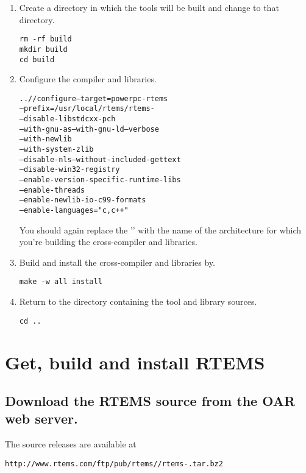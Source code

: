 \documentclass{report}
\begin{document}
\begin{enumerate}
\item Create a directory in which the tools will be built and
change to that directory.
\begin{verbatim}
rm -rf build
mkdir build
cd build
\end{verbatim}

\item Configure the compiler and libraries.
\begin{alltt}
../\GCC/configure --target=powerpc-rtems\rtemsVersion \verb@\@
            --prefix=/usr/local/rtems/rtems-\rtemsVersion \verb@\@
            --disable-libstdcxx-pch \verb@\@
            --with-gnu-as --with-gnu-ld --verbose \verb@\@
            --with-newlib \verb@\@
            --with-system-zlib \verb@\@
            --disable-nls --without-included-gettext \verb@\@
            --disable-win32-registry \verb@\@
            --enable-version-specific-runtime-libs \verb@\@
            --enable-threads \verb@\@
            --enable-newlib-io-c99-formats \verb@\@
            --enable-languages="c,c++"

\end{alltt}
You should again replace the '\verb@powerpc@' with the name of the architecture
for which you're
building the cross-compiler and libraries.

\item Build and install the cross-compiler and libraries by.
\begin{verbatim}
make -w all install
\end{verbatim}

\item Return to the directory containing the tool and library sources.
\begin{verbatim}
cd ..
\end{verbatim}
\end{enumerate}



\section{Get, build and install RTEMS}
\subsection {Download the RTEMS source from the OAR web server.}

The source releases are available at

\begin{alltt}
http://www.rtems.com/ftp/pub/rtems/\rtemsVersion/rtems-\rtemsVersion.tar.bz2
\end{alltt}
\end{document}
